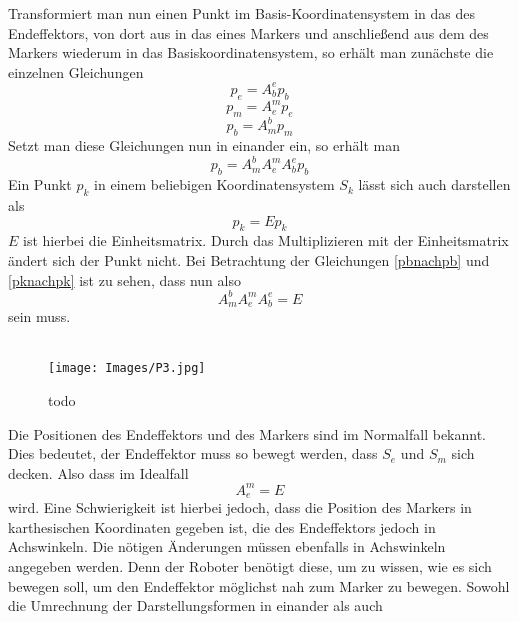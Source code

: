 \documentclass[a4paper,12pt,twoside,openright,DIV=9
]{scrbook}
\begin{document}
Transformiert man nun einen Punkt im Basis-Koordinatensystem in das des Endeffektors, von dort aus in das eines Markers und anschließend aus dem des Markers wiederum in das Basiskoordinatensystem, so erhält man zunächste die einzelnen Gleichungen
\begin{equation}
p_e=A_b^ep_b
\label{pbnachpe}
\end{equation}
\begin{equation}
p_m=A_e^mp_e
\label{penachpm}
\end{equation}
\begin{equation}
p_b=A_m^bp_m
\label{pmnachpb}
\end{equation}
Setzt man diese Gleichungen nun in einander ein, so erhält man
\begin{equation}
p_b=A_m^bA_e^mA_b^ep_b
\label{pbnachpb}
\end{equation}
Ein Punkt $p_k$ in einem beliebigen Koordinatensystem $S_k$ lässt sich auch darstellen als 
\begin{equation}
p_k=Ep_k
\label{pknachpk}
\end{equation}
$E$ ist hierbei die Einheitsmatrix. Durch das Multiplizieren mit der Einheitsmatrix ändert sich der Punkt nicht. Bei Betrachtung der Gleichungen \ref{pbnachpb} und \ref{pknachpk} ist zu sehen, dass nun also 
\begin{equation}
A_m^bA_e^mA_b^e=E 
\label{E}
\end{equation}
sein muss.\\ \\
\begin{figure}[h] 
  \centering
     \texttt{[image: Images/P3.jpg]}
  \caption{todo}
  \label{loop}
\end{figure}


Die Positionen des Endeffektors und des Markers sind im Normalfall bekannt. Dies bedeutet, der Endeffektor muss so bewegt werden, dass $S_e$ und $S_m$ sich decken. Also dass im Idealfall
\begin{equation}
A_e^m=E
\label{aemistE}
\end{equation}
wird. Eine Schwierigkeit ist hierbei jedoch, dass die Position des Markers in karthesischen Koordinaten gegeben ist, die des Endeffektors jedoch in Achswinkeln. Die nötigen Änderungen müssen ebenfalls in Achswinkeln angegeben werden. Denn der Roboter benötigt diese, um zu wissen, wie es sich bewegen soll, um den Endeffektor möglichst nah zum Marker zu bewegen.
Sowohl die Umrechnung der Darstellungsformen in einander als auch 
\end{document}
